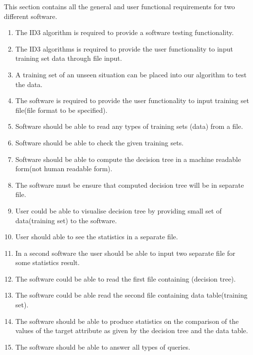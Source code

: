 \documentclass{report}
\begin{document}
This section contains all the general and user functional requirements for two different software.
\begin{enumerate}

\item The ID3 algorithm is required to provide a software testing functionality.

\item The ID3 algorithms is required to provide the user functionality to input training set data through file input.

\item A training set of an unseen situation can be placed into our algorithm to test the data.

\item The software is required to provide the user functionality to input training set file(file format to be specified).

\item Software should be able to read any types of training sets (data) from a file.

\item Software should be able to check the given training sets.

\item Software should be able to compute the decision tree in a machine readable form(not human readable form).

\item The software must be ensure that computed decision tree will be in separate file.

\item User could be able to visualise decision tree by providing small set of data(training set) to the software.

\item User should able to see the statistics in a separate file.

\item In a second software the user should be able to input two separate file for some statistics result.

\item The software could be able to read the first file containing (decision tree). 

\item The software could be able read the second file containing data table(training set). 

\item The software should be able to produce statistics on the comparison of the values of the target attribute as given by the decision tree and the data table.

\item The software should be able to answer all types of queries.

\end{enumerate}
\end{document}

